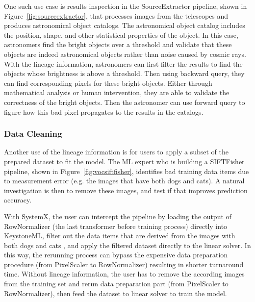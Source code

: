 \documentclass{sig-alternate}
\begin{document}
One such use case is results inspection in the SourceExtractor pipeline, shown in Figure~\ref{fig:sourceextractor},
that processes images from the telescopes and produces astronomical object catalogs. 
The astronomical object catalog includes the position, shape, and other statistical properties of the object.
In this case, astronomers find the bright objects over a threshold and validate that these objects are indeed astronomical objects rather
than noise caused by cosmic rays.
With the lineage information, astronomers can first filter the results to find the objects whose brightness is above a threshold.
Then using backward query, they can find corresponding pixels for these bright objects. 
Either through mathematical analysis or human intervention, they are able to validate the correctness of the bright objects.
Then the astronomer can use forward query to figure how this bad pixel propagates to the results in the catalogs.

\subsubsection{Data Cleaning}
\label{sec:Back-Case-Cleaning}
Another use of the lineage information is for users to apply a subset of the prepared dataset to fit the model. 
The ML expert who is building a SIFTFisher pipeline, shown in Figure~\ref{fig:vocsiftfisher}, identifies bad 
training data items due to measurement error (e.g. the images that have both dogs and cats). A natural 
investigation is then to remove these images, and test if that improves prediction accuracy.

With SystemX, the user can intercept the pipeline by loading the output of RowNormalizer (the last transformer before training process) 
directly into KeystoneML, filter out the data items that are derived from the images with both dogs and cats , 
and apply the filtered dataset directly to the linear solver.
In this way, the rerunning process can bypass the expensive data preparation procedure (from PixelScaler to RowNormalizer) 
resulting in shorter turnaround time.
Without lineage information, the user has to remove the according images from the training set and rerun data
preparation part (from PixelScaler to RowNormalizer), then feed the dataset to linear solver to train the model.
\end{document}

